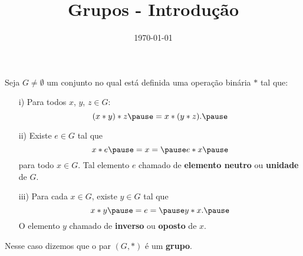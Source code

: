\documentclass{beamer}
\title{Grupos - Introdução}
\author[\autor]{\autor}
\institute[\instituto]{\instituto}
\date{\today}
\begin{document}
    \begin{frame}
        \maketitle
    \end{frame}


    \begin{frame}
        \begin{definicao}
            Seja $G \ne \emptyset$ \pause um conjunto no qual est\'a definida uma opera{\c c}{\~a}o bin{\'a}ria $*$ \pause tal que:\pause
            \begin{enumerate}
                \item[i)] Para todos $x$, $y$, $z\in G$:\pause
                \[
                    (x*y)*z \pause = x*(y*z).\pause
                \]
                
                \item[ii)] Existe $e \in G$ \pause tal que\pause
                \[
                    x*e \pause = x = \pause e*x\pause
                \]
                para todo $x \in G$. \pause Tal elemento $e$  chamado de \textbf{elemento neutro} \pause ou \textbf{unidade} \pause de $G$.\pause

            \end{enumerate}
        \end{definicao}
    \end{frame}

    \begin{frame}
        \begin{definicao}
            \begin{enumerate}
                \item[iii)] Para cada $x \in G$, \pause existe $y \in G$ \pause tal que\pause
                \[
                    x*y \pause = e = \pause y*x.\pause
                \]
                O elemento $y$  chamado de \textbf{inverso} \pause ou \textbf{oposto} \pause de $x$.\pause
            \end{enumerate}
            Nesse caso dizemos que o par $(G, *)$ \pause \'e um \textbf{grupo}.\pause
        \end{definicao}
    \end{frame}
\end{document}
